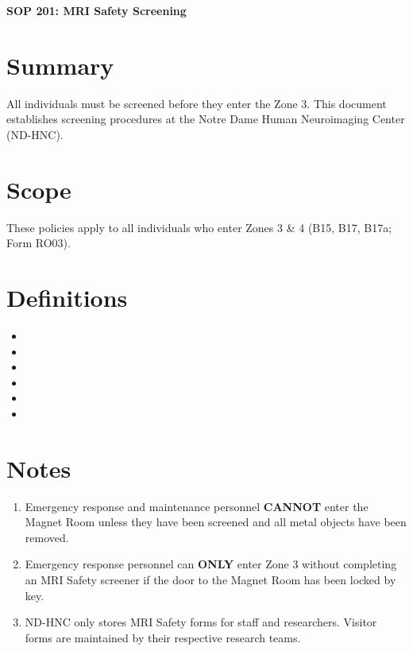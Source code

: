 \documentclass[11pt]{article}
\begin{document}
\renewcommand{\labelenumii}{\arabic{enumi}.\arabic{enumii}}
\renewcommand{\labelenumiii}{\arabic{enumi}.\arabic{enumii}.\arabic{enumiii}}
\renewcommand{\labelenumiv}{\arabic{enumi}.\arabic{enumii}.\arabic{enumiii}.\arabic{enumiv}}

\begin{center}
	\textbf{\Large SOP 201: MRI Safety Screening}\\
	\hrulefill
\end{center}


\section{Summary}
All individuals must be screened before they enter the Zone 3. This document establishes screening procedures at the Notre Dame Human Neuroimaging Center (ND-HNC).


\section{Scope}
These policies apply to all individuals who enter Zones 3 \& 4 (B15, B17, B17a; Form RO03).


\section{Definitions}

\begin{itemize}
    \item \ElectronicLock
    \item \Lead
	\item \MagnetRoom
	\item \NDHNC
	\item \Operator
	\item \Visitor
\end{itemize}

\section{Notes}

\begin{enumerate}
    \item Emergency response and maintenance personnel \textbf{CANNOT} enter the Magnet Room unless they have been screened and all metal objects have been removed.
	\item Emergency response personnel can \textbf{ONLY} enter Zone 3 without completing an MRI Safety screener if the door to the Magnet Room has been locked by key.
	\item ND-HNC only stores MRI Safety forms for staff and researchers. Visitor forms are maintained by their respective research teams.
\end{enumerate}
\end{document}
